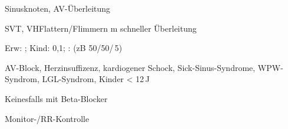{
\begin{MedikamentCharakteristika}
  \item[{\TxItemSpezialitaeten}] 
  
  Sinusknoten, AV-Überleitung
  \item[{\TxItemIndikation}] 
  \item[{\TxItemKontraindikation}] SVT,
  VHFlattern/Flimmern m schneller Überleitung
  \item[{\TxItemDosierung}] Erw: \Mg*;
  Kind: 0,1\MgKg*;
  : \MgKgH* (zB 50\Mg/50\Ml*/\,5)
  \item[{\TxItemKontraindikation}]  AV-Block, Herzinsuffizenz, 
  kardiogener Schock, Sick-Sinus-Syndrome,
  WPW-Syndrom, LGL-Syndrom, Kinder {\textless} 12\,J
  
  \begin{Danger}
    \item Keinesfalls mit Beta-Blocker
  \end{Danger}
  
  Monitor-/RR-Kontrolle
\end{MedikamentCharakteristika}
}
{}




\section{}


